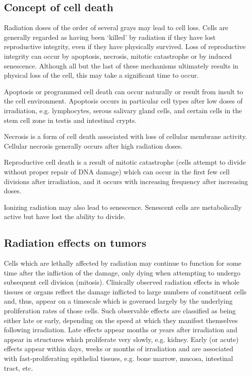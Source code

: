 \documentclass{article}
\begin{document}
\subsection*{Concept of cell death}
Radiation doses of the order of several grays may lead to cell loss. Cells
are generally regarded as having been ‘killed’ by radiation if they have lost
reproductive integrity, even if they have physically survived. Loss of reproductive
integrity can occur by apoptosis, necrosis, mitotic catastrophe or by induced
senescence. Although all but the last of these mechanisms ultimately results in
physical loss of the cell, this may take a significant time to occur.

Apoptosis or programmed cell death can occur naturally or result from
insult to the cell environment. Apoptosis occurs in particular cell types after low
doses of irradiation, e.g. lymphocytes, serous salivary gland cells, and certain
cells in the stem cell zone in testis and intestinal crypts.

Necrosis is a form of cell death associated with loss of cellular membrane
activity. Cellular necrosis generally occurs after high radiation doses.

Reproductive cell death is a result of mitotic catastrophe (cells attempt
to divide without proper repair of DNA damage) which can occur in the first
few cell divisions after irradiation, and it occurs with increasing frequency after
increasing doses.

Ionizing radiation may also lead to senescence. Senescent cells are
metabolically active but have lost the ability to divide.

\subsection*{Radiation effects on tumors}
Cells which are lethally affected by radiation may continue to function
for some time after the infliction of the damage, only dying when attempting
to undergo subsequent cell division (mitosis). Clinically observed radiation
effects in whole tissues or organs reflect the damage inflicted to large numbers
of constituent cells and, thus, appear on a timescale which is governed largely
by the underlying proliferation rates of those cells. Such observable effects
are classified as being either late or early, depending on the speed at which
they manifest themselves following irradiation. Late effects appear months or
years after irradiation and appear in structures which proliferate very slowly,
e.g. kidney. Early (or acute) effects appear within days, weeks or months of
irradiation and are associated with fast-proliferating epithelial tissues, e.g. bone marrow, mucosa, intestinal tract, etc.
\end{document}
